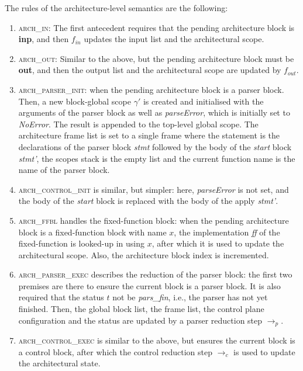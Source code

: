 \documentclass[UTF8]{article}
\begin{document}
The rules of the architecture-level semantics are the following:
\begin{enumerate}
\item \textsc{arch\_in}: The first antecedent requires that the pending architecture block is \textbf{inp}, and then $f_{ \mathit{in} }$ updates the input list and the architectural scope.

\item \textsc{arch\_out}: Similar to the above, but the pending architecture block must be \textbf{out}, and then the output list and the architectural scope are updated by $f_{ \mathit{out} }$.

\item \textsc{arch\_parser\_init}: when the pending architecture block is a parser block. Then, a new block-global scope $\gamma'$ is created and initialised with the arguments of the parser block as well as \textit{parseError}, which is initially set to \textit{NoError}. The result is appended to the top-level global scope. The architecture frame list is set to a single frame where the statement is the declarations of the parser block \textit{stmt} followed by the body of the \textit{start} block \textit{stmt'}, the scopes stack is the empty list and the current function name is the name of the parser block.

\item \textsc{arch\_control\_init} is similar, but simpler: here, \textit{parseError} is not set, and the body of the \textit{start} block is replaced with the body of the apply \textit{stmt'}.

\item \textsc{arch\_ffbl} handles the fixed-function block: when the pending architecture block is a fixed-function block with name $x$, the implementation \textit{ff} of the fixed-function is looked-up in \ffbm{} using $x$, after which it is used to update the architectural scope. Also, the architecture block index is incremented.

\item \textsc{arch\_parser\_exec} describes the reduction of the parser block: the first two premises are there to ensure the current block is a parser block. It is also required that the status $t$ not be \textit{pars\_fin}, i.e., the parser has not yet finished. Then, the global block list, the frame list, the control plane configuration and the status are updated by a parser reduction step $\longrightarrow_p$.

\item \textsc{arch\_control\_exec} is similar to the above, but ensures the current block is a control block, after which the control reduction step $\longrightarrow_c$ is used to update the architectural state.


\end{enumerate}
\end{document}
